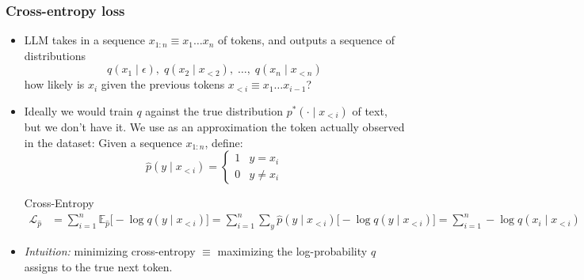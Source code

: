 \begin{frame}[shrink=15]
\frametitle{Cross-entropy loss}
\begin{itemize}
    \item LLM takes in a sequence $x_{1:n} \equiv x_1 \ldots x_n$ of tokens, and outputs a sequence of
    distributions 
    $$
    q(x_1 \mid \epsilon), \; q(x_2 \mid x_{<2}), \; \ldots, \; q(x_n \mid x_{<n})
    $$
    how likely is $x_i$ given the previous tokens $x_{<i} \equiv x_1 \ldots x_{i-1}$?
    \pause
    \item Ideally we would train $q$ against the true distribution
    $p^*(\cdot \mid x_{<i})$ of text, but we don't have it. We use as an
    approximation the token actually observed in the dataset: Given a sequence $x_{1:n}$, define:
    $$
    \hat{p}(y \mid x_{<i}) = \begin{cases}
    1 & y = x_i \\
    0 & y \neq x_i 
    \end{cases}
    $$
    \pause
    \begin{block}{Cross-Entropy}
        \vspace{-0.3cm}
        \begin{align*}
        \mathcal{L}_{\hat{p}} &= \sum_{i=1}^n \mathbb{E}_{\hat{p}} 
        \bigg[ - \log q(y \mid x_{<i}) \bigg] 
        = \sum_{i=1}^n \sum_{y} \hat{p}(y \mid x_{<i}) \bigg[ - \log q(y \mid x_{<i}) \bigg]
        = \sum_{i=1}^n - \log q(x_i \mid x_{<i})
        \end{align*}
    \end{block}
    \pause
    \item \emph{Intuition:} minimizing cross-entropy $\equiv$
    maximizing the log-probability $q$ assigns to the true next token.
\end{itemize}
\end{frame}



